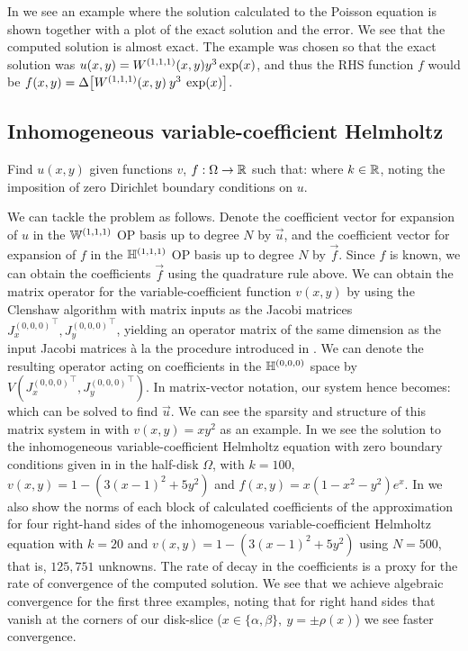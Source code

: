 In  we see an example where the solution calculated to the Poisson equation is shown together with a plot of the exact solution and the error. We see that the computed solution is almost exact. The example was chosen so that the exact solution was $u(x,y) = W^{(1,1,1)} (x,y) y^3 \exp(x)$, and thus the RHS function $f$ would be $f(x,y) = \Delta \big[ W^{(1,1,1)}(x,y) \: y^3 \: \exp(x) \big]$.


\subsection{Inhomogeneous variable-coefficient Helmholtz}

Find $u(x,y)$ given functions $v$, $f : \Omega \to \mathbb{R}$ such that:
where $k \in \mathbb{R}$, noting the imposition of zero Dirichlet boundary conditions on $u$.

We can tackle the problem as follows. Denote the coefficient vector for expansion of $u$ in the ${\mathbb{W}^{(1,1,1)}}$ OP basis up to degree $N$ by $\vec{u}$, and the coefficient vector for expansion of $f$ in the ${\mathbb{H}^{(1,1,1)}}$ OP basis up to degree $N$ by $\vec{f}$. Since $f$ is known, we can obtain  the coefficients $\vec{f}$ using the quadrature rule above. We can obtain the matrix operator for the variable-coefficient function $v(x,y)$ by using the Clenshaw algorithm with matrix inputs as the Jacobi matrices ${J_x^{(0,0,0)}}^\top, {J_y^{(0,0,0)}}^\top$, yielding an operator matrix of the same dimension as the input Jacobi matrices \`a la the procedure introduced in \cite{olver2019triangle}. We can denote the resulting operator acting on coefficients in the ${\mathbb{H}^{(0,0,0)}}$ space by $V({J_x^{(0,0,0)}}^\top, {J_y^{(0,0,0)}}^\top)$. In matrix-vector notation, our system hence becomes:
which can be solved to find $\vec{u}$. We can see the sparsity and structure of this matrix system in  with $v(x,y) = xy^2$ as an example. In  we see the solution to the inhomogeneous variable-coefficient Helmholtz equation with zero boundary conditions given in  in the half-disk $\Omega$, with $k=100$, $v(x,y) = 1 - (3(x-1)^2 + 5y^2)$ and $f(x,y) = x(1-x^2-y^2)e^x$. In  we also show the norms of each block of calculated coefficients of the approximation for four right-hand sides of the inhomogeneous variable-coefficient Helmholtz equation with $k=20$ and $v(x,y) = 1 - (3(x-1)^2 + 5y^2)$ using $N = 500$, that is, $125,751$ unknowns. The rate of decay in the coefficients is a proxy for the rate of convergence of the computed solution. We see that we achieve algebraic convergence for the first three examples, noting that for right hand sides that vanish at the corners of our disk-slice ($x\in\{\alpha,\beta\}, \: y = \pm \rho(x)$) we see faster convergence.

